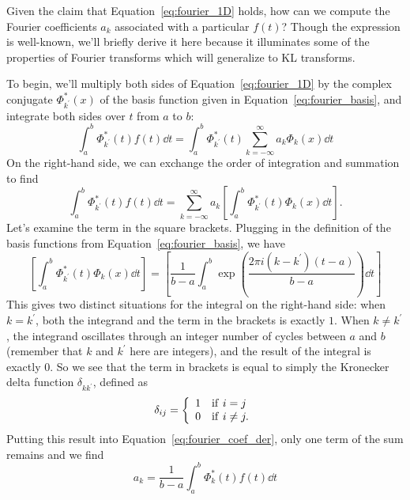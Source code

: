 Given the claim that Equation~\ref{eq:fourier_1D} holds, how can we
compute the Fourier coefficients $a_k$ associated with 
a particular $f(t)$?  Though the expression is well-known, we'll briefly
derive it here because it illuminates some of the properties of
Fourier transforms which will generalize to KL transforms.

To begin, we'll multiply both sides of Equation~\ref{eq:fourier_1D} by the
complex conjugate $\Phi^\ast_{k^\prime}(x)$ of the basis function given
in Equation~\ref{eq:fourier_basis}, and integrate both sides over $t$
from $a$ to $b$:
\begin{equation}
  \int_a^b \Phi^\ast_{k^\prime}(t) f(t) \dd t
  = \int_a^b \Phi^\ast_{k^\prime}(t) \sum_{k=-\infty}^\infty a_k\Phi_k(x)\dd t
\end{equation}
On the right-hand side, we can exchange the order of integration and
summation to find 
\begin{equation}
  \label{eq:fourier_coef_der}
  \int_a^b \Phi^\ast_{k^\prime}(t) f(t) \dd t
  =  \sum_{k=-\infty}^\infty a_k \left[\int_a^b \Phi^\ast_{k^\prime}(t)\Phi_k(x)\dd t\right].
\end{equation}
Let's examine the term in the square brackets.  Plugging in the definition
of the basis functions from Equation~\ref{eq:fourier_basis}, we have
\begin{equation}
  \left[\int_a^b \Phi^\ast_{k^\prime}(t)\Phi_k(x)\dd t\right]
  = \left[\frac{1}{b-a}\int_a^b \exp\left(\frac{2\pi i (k - k^\prime) (t-a)}
    {b - a}\right)\dd t\right]
\end{equation}
This gives two distinct situations for the integral on the right-hand side:
when $k=k^\prime$, both the integrand 
and the term in the brackets is exactly $1$.  When $k\ne k^\prime$,
the integrand oscillates through an integer number of cycles between
$a$ and $b$ (remember that $k$ and $k^\prime$ here are integers),
and the result of the integral is exactly $0$.
So we see that the term in brackets is equal to simply 
the Kronecker delta function $\delta_{kk^\prime}$, defined as
\begin{equation}
  \delta_{ij} = \left\{
  \begin{array}{ll}
    1 & {\rm if}\ i = j\\
    0 & {\rm if}\ i \ne j.
  \end{array}
  \right.
\end{equation}
Putting this result into Equation~\ref{eq:fourier_coef_der}, only one
term of the sum remains and we find
\begin{equation}
  \label{eq:fourier_coef}
  a_k = \frac{1}{b - a}\int_a^b \Phi^\ast_k(t) f(t) \dd t
\end{equation}

